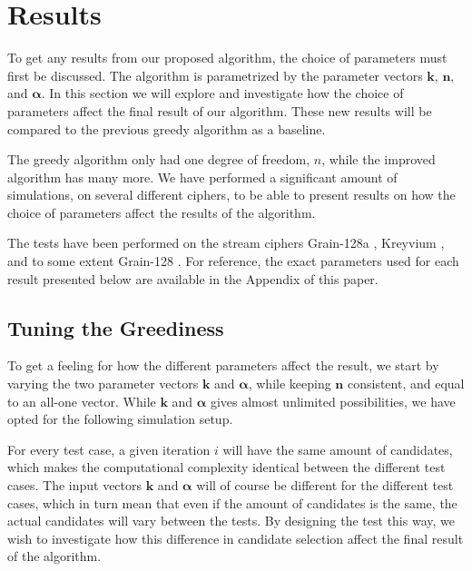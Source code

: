 {\section{Results} \label{sec:results}
To get any results from our proposed algorithm, the choice of parameters must first be discussed. The algorithm is parametrized by the parameter vectors $\bm{k}$, $\bm{n}$, and $\bm{\alpha}$. In this section we will explore and investigate how the choice of parameters affect the final result of our algorithm. These new results will be compared to the previous greedy algorithm as a baseline.

The greedy algorithm only had one degree of freedom, $n$, while the improved algorithm has many more. We have performed a significant amount of simulations, on several different ciphers, to be able to present results on how the choice of parameters affect the results of the algorithm.

The tests have been performed on the stream ciphers Grain-128a \cite{agren:2011}, Kreyvium \cite{canteaut:2016}, and to some extent Grain-128 \cite{hell:2006b}. For reference, the exact parameters used for each result presented below are available in the Appendix of this paper.

\subsection{Tuning the Greediness} \label{sec:tuninggreedy}

To get a feeling for how the different parameters affect the result, we start by varying the two parameter vectors $\bm{k}$ and $\bm{\alpha}$, while keeping $\bm{n}$ consistent, and equal to an all-one vector.
While $\bm{k}$ and $\bm{\alpha}$ gives almost unlimited possibilities, we have opted for the following simulation setup.

For every test case, a given iteration $i$ will have the same amount of candidates, which makes the computational complexity identical between the different test cases. The input vectors $\bm{k}$ and $\bm{\alpha}$ will of course be different for the different test cases, which in turn mean that even if the amount of candidates is the same, the actual candidates will vary between the tests. By designing the test this way, we wish to investigate how this difference in candidate selection affect the final result of the algorithm.

}
